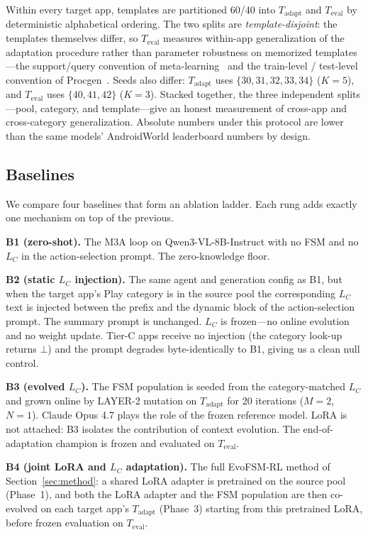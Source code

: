 Within every target app, templates are partitioned 60/40 into $T_{\text{adapt}}$ and $T_{\text{eval}}$ by deterministic alphabetical ordering. The two splits are \emph{template-disjoint}: the templates themselves differ, so $T_{\text{eval}}$ measures within-app generalization of the adaptation procedure rather than parameter robustness on memorized templates---the support/query convention of meta-learning~\citep{finn2017maml} and the train-level / test-level convention of Procgen~\citep{cobbe2020procgen}. Seeds also differ: $T_{\text{adapt}}$ uses $\{30, 31, 32, 33, 34\}$ ($K{=}5$), and $T_{\text{eval}}$ uses $\{40, 41, 42\}$ ($K{=}3$). Stacked together, the three independent splits---pool, category, and template---give an honest measurement of cross-app and cross-category generalization. Absolute numbers under this protocol are lower than the same models' AndroidWorld leaderboard numbers by design.

\subsection{Baselines}
\label{sec:eval-baselines}

We compare four baselines that form an ablation ladder. Each rung adds exactly one mechanism on top of the previous.

\textbf{B1 (zero-shot).} The M3A loop on Qwen3-VL-8B-Instruct with no FSM and no $L_C$ in the action-selection prompt. The zero-knowledge floor.

\textbf{B2 (static $L_C$ injection).} The same agent and generation config as B1, but when the target app's Play category is in the source pool the corresponding $L_C$ text is injected between the prefix and the dynamic block of the action-selection prompt. The summary prompt is unchanged. $L_C$ is frozen---no online evolution and no weight update. Tier-C apps receive no injection (the category look-up returns $\bot$) and the prompt degrades byte-identically to B1, giving us a clean null control.

\textbf{B3 (evolved $L_C$).} The FSM population is seeded from the category-matched $L_C$ and grown online by LAYER-2 mutation on $T_{\text{adapt}}$ for 20 iterations ($M{=}2$, $N{=}1$). Claude Opus 4.7 plays the role of the frozen reference model. LoRA is not attached: B3 isolates the contribution of context evolution. The end-of-adaptation champion is frozen and evaluated on $T_{\text{eval}}$.

\textbf{B4 (joint LoRA and $L_C$ adaptation).} The full EvoFSM-RL method of Section~\ref{sec:method}: a shared LoRA adapter is pretrained on the source pool (Phase~1), and both the LoRA adapter and the FSM population are then co-evolved on each target app's $T_{\text{adapt}}$ (Phase~3) starting from this pretrained LoRA, before frozen evaluation on $T_{\text{eval}}$.


